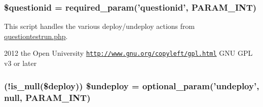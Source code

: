 \label{deploy_8php_ab3dbd2b3f38fc871b3aba59ed0657c55}
\hypertarget{deploy_8php_a0b8a9e6194c5b1ca51e0f19a198c19d8}{
\subsubsection[{\$questionid}]{\setlength{\rightskip}{0pt plus 5cm}\$questionid = required\_\-param('questionid', PARAM\_\-INT)}}
\label{deploy_8php_a0b8a9e6194c5b1ca51e0f19a198c19d8}
This script handles the various deploy/undeploy actions from \hyperlink{questiontestrun_8php}{questiontestrun.php}.

2012 the Open University  \href{http://www.gnu.org/copyleft/gpl.html}{\tt http://www.gnu.org/copyleft/gpl.html} GNU GPL v3 or later \hypertarget{deploy_8php_aef06c52c3d0d3d9f585fcffd074b1d14}{
\subsubsection[{\$undeploy}]{ (!is\_\-null(\$deploy)) \$undeploy = optional\_\-param('undeploy', null, PARAM\_\-INT)}}
\label{deploy_8php_aef06c52c3d0d3d9f585fcffd074b1d14}
